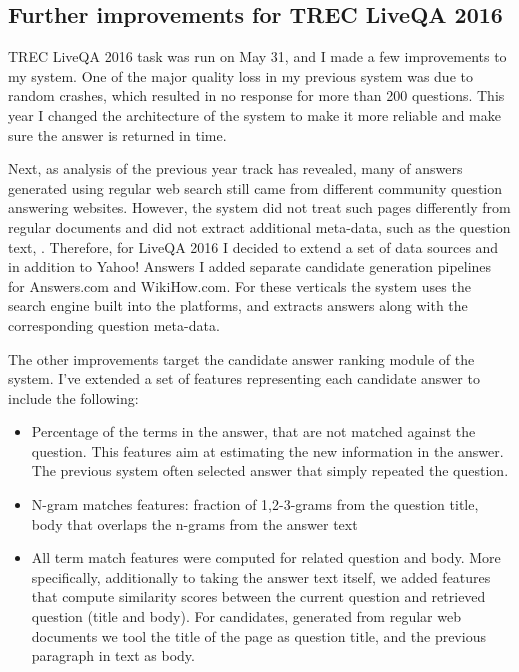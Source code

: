 \subsection{Further improvements for TREC LiveQA 2016}
\label{section:non-factoid:liveqa:improvements}

TREC LiveQA 2016 task was run on May 31, and I made a few improvements to my system.
One of the major quality loss in my previous system was due to random crashes, which resulted in no response for more than 200 questions.
This year I changed the architecture of the system to make it more reliable and make sure the answer is returned in time.

Next, as analysis of the previous year track has revealed, many of answers generated using regular web search still came from different community question answering websites.
However, the system did not treat such pages differently from regular documents and did not extract additional meta-data, such as the question text, \etc.
Therefore, for LiveQA 2016 I decided to extend a set of data sources and in addition to Yahoo! Answers I added separate candidate generation pipelines for Answers.com and WikiHow.com.
For these verticals the system uses the search engine built into the platforms, and extracts answers along with the corresponding question meta-data.

The other improvements target the candidate answer ranking module of the system.
I've extended a set of features representing each candidate answer to include the following:
\begin{itemize}
	\item Percentage of the terms in the answer, that are not matched against the question. This features aim at estimating the new information in the answer. The previous system often selected answer that simply repeated the question.
	\item N-gram matches features: fraction of 1,2-3-grams from the question title, body that overlaps the n-grams from the answer text
	\item All term match features were computed for related question and body. More specifically, additionally to taking the answer text itself, we added features that compute similarity scores between the current question and retrieved question (title and body). For candidates, generated from regular web documents we tool the title of the page as question title, and the previous paragraph in text as body.
\end{itemize}

